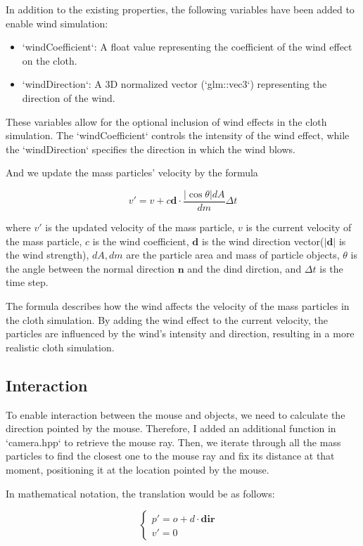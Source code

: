 \documentclass[acmtog]{acmart}
\begin{document}
In addition to the existing properties, the following variables have been added to enable wind simulation:

\begin{itemize}
\item `windCoefficient`: A float value representing the coefficient of the wind effect on the cloth.
\item `windDirection`: A 3D normalized vector (`glm::vec3`) representing the direction of the wind.
\end{itemize}

These variables allow for the optional inclusion of wind effects in the cloth simulation. The `windCoefficient` controls the intensity of the wind effect, while the `windDirection` specifies the direction in which the wind blows.

And we update the mass particles' velocity by the formula

$$ v' = v + c \textbf{d} \cdot \frac{|\cos{\theta}|dA}{dm} \Delta t $$

where \(v'\) is the updated velocity of the mass particle, \(v\) is the current velocity of the mass particle, \(c\) is the wind coefficient, \(\textbf{d}\) is the wind direction vector(\(|\textbf{d}|\) is the wind strength), \(dA, dm\) are the particle area and mass of particle objects, \(\theta\) is the angle between the normal direction \(\textbf{n}\) and the dind dirction, and \(\Delta t\) is the time step.

The formula describes how the wind affects the velocity of the mass particles in the cloth simulation. By adding the wind effect to the current velocity, the particles are influenced by the wind's intensity and direction, resulting in a more realistic cloth simulation.

\subsection{Interaction}
To enable interaction between the mouse and objects, we need to calculate the direction pointed by the mouse. Therefore, I added an additional function in `camera.hpp` to retrieve the mouse ray. Then, we iterate through all the mass particles to find the closest one to the mouse ray and fix its distance at that moment, positioning it at the location pointed by the mouse.

In mathematical notation, the translation would be as follows:

\[
\left\{
\begin{array}{ll}
p' = o + d \cdot \textbf{dir} & \\
v' = 0 &
\end{array}\right.
\]
\end{document}
